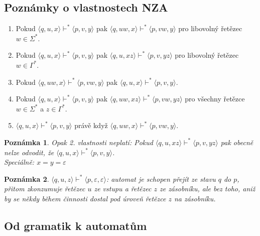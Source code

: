 \documentclass[10pt, a4paper, titlepage]{article}
\theoremstyle{note}
\newtheorem{poznamka}{\textbf{Poznámka}}
\begin{document}
\subsection{Poznámky o vlastnostech NZA}

\begin{enumerate}
\item 
Pokud $\langle q,u,x \rangle \vdash^* \langle p,v,y \rangle$ pak $\langle q,uw,x \rangle \vdash^* \langle p,vw,y \rangle$ pro libovolný řetězec $w \in \Sigma^*$.

\item
Pokud $\langle q,u,x \rangle \vdash^* \langle p,v,y \rangle$ pak $\langle q,u,xz \rangle \vdash^* \langle p,v,yz \rangle$ pro libovolný řetězec $w \in \Gamma^*$.

\item
Pokud $\langle q,uw,x \rangle \vdash^* \langle p,vw,y \rangle$ pak $\langle q,u,x \rangle \vdash^* \langle p,v,y \rangle$.

\item[1.+2.]
Pokud $\langle q,u,x \rangle \vdash^* \langle p,v,y \rangle$ pak $\langle q,uw,xz \rangle \vdash^* \langle p,vw,yz \rangle$ pro všechny řetězce $w \in \Sigma^* $ a $z \in \Gamma^*$.

\item[1.+3.]
$\langle q,u,x \rangle \vdash^* \langle p,v,y \rangle$ právě když $\langle q,uw,x \rangle \vdash^* \langle p,vw,y \rangle$.
\end{enumerate}

\begin{poznamka}
Opak 2. vlastnosti neplatí: Pokud $\langle q,u,xz \rangle \vdash^* \langle p,v,yz \rangle$ pak obecně nelze odvodit, že $\langle q,u,x \rangle \vdash^* \langle p,v,y \rangle$.\\
Speciálně: $x=y=\varepsilon$
\end{poznamka}

\begin{poznamka}
$\langle q,u,z \rangle \vdash^* \langle p,\varepsilon,\varepsilon \rangle$: automat je schopen přejít ze stavu $q$ do $p$, přitom zkonzumuje řetězec $u$ ze vstupu a řetězec $z$ ze zásobníku, ale bez toho, aniž by se někdy během činnosti dostal pod úroveň řetězce $z$ na zásobníku.
\end{poznamka}

\subsection{Od gramatik k automatům}
\end{document}
